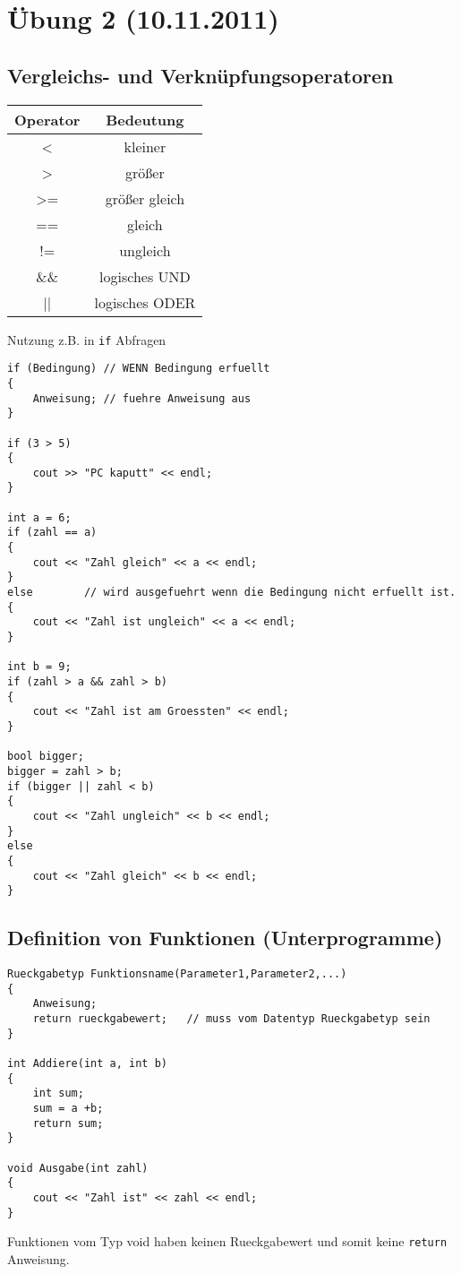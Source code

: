 \section{Übung 2 (10.11.2011)}
\subsection{Vergleichs- und Verknüpfungsoperatoren}
\begin{table}[h]
\begin{tabular}{c|c}
Operator & Bedeutung \\
\hline
< & kleiner \\
> & größer \\
>= & größer gleich \\
== & gleich \\
!= & ungleich \\
\&\& & logisches UND \\
|| & logisches ODER \\
\end{tabular}
\end{table}
Nutzung z.B. in \texttt{if} Abfragen
\begin{lstlisting}
if (Bedingung) // WENN Bedingung erfuellt
{
	Anweisung; // fuehre Anweisung aus
}

if (3 > 5)
{
	cout >> "PC kaputt" << endl;
}

int a = 6;
if (zahl == a)
{
	cout << "Zahl gleich" << a << endl;
}
else		// wird ausgefuehrt wenn die Bedingung nicht erfuellt ist.
{
	cout << "Zahl ist ungleich" << a << endl;
}

int b = 9;
if (zahl > a && zahl > b)
{
	cout << "Zahl ist am Groessten" << endl;
}

bool bigger;
bigger = zahl > b;
if (bigger || zahl < b)
{
	cout << "Zahl ungleich" << b << endl;
}
else
{
	cout << "Zahl gleich" << b << endl;
}
\end{lstlisting}

\subsection{Definition von Funktionen (Unterprogramme)}
\begin{lstlisting}
Rueckgabetyp Funktionsname(Parameter1,Parameter2,...)
{
	Anweisung;
	return rueckgabewert; 	// muss vom Datentyp Rueckgabetyp sein
}

int Addiere(int a, int b)
{
	int sum;
	sum = a +b;
	return sum;
}

void Ausgabe(int zahl)
{
	cout << "Zahl ist" << zahl << endl;
}
\end{lstlisting}
Funktionen vom Typ void haben keinen Rueckgabewert und somit keine \texttt{return} Anweisung.

